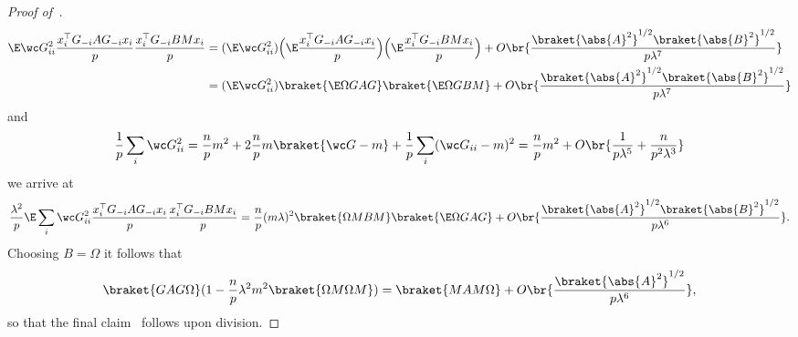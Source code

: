 \begin{proof}[Proof of~]
\begin{equation}
        \begin{split}
            \E\wc G_{ii}^2 \frac{x_i^\top G_{-i} AG_{-i}x_i}{p}\frac{x_i^\top G_{-i} B M x_i}{p} &= (\E \wc G_{ii}^2) \Bigl(\E \frac{x_i^\top G_{-i} A G_{-i}x_i}{p}\Bigr) \Bigl(\E \frac{x_i^\top G_{-i} B M x_i}{p}\Bigr) + O\br{\frac{\braket{\abs{A}^2}^{1/2}\braket{\abs{B}^2}^{1/2}}{p\lambda^7}}\\
            &=(\E \wc G_{ii}^2) \braket{\E \Omega G A G} \braket{ \E \Omega G B M} + O\br{\frac{\braket{\abs{A}^2}^{1/2}\braket{\abs{B}^2}^{1/2}}{p\lambda^7}}
        \end{split}
    \end{equation}
    and
    \begin{equation}
        \frac{1}{p}\sum_i \wc G_{ii}^2 = \frac{n}{p}m^2 +2 \frac{n}{p}m \braket{\wc G-m} + \frac{1}{p}\sum_i (\wc G_{ii}-m)^2= \frac{n}{p}m^2 +O\br{\frac{1}{p\lambda^5} + \frac{n}{p^2\lambda^3}}
    \end{equation}
    we arrive at
    \begin{equation}
        \frac{\lambda^2}{p} \E\sum_i \wc G_{ii}^2 \frac{x_i^\top G_{-i} AG_{-i}x_i}{p}\frac{x_i^\top G_{-i} B M x_i}{p} = \frac{n}{p}(m\lambda)^2 \braket{\Omega M B M} \braket{\E \Omega G A G} + O\br{\frac{\braket{\abs{A}^2}^{1/2}\braket{\abs{B}^2}^{1/2}}{p\lambda^6}}.
    \end{equation}
    Choosing $B=\Omega$ it follows that
    \begin{equation}
        \braket{GA G \Omega}(1 - \frac{n}{p}\lambda^2 m^2 \braket{\Omega M \Omega M}) = \braket{MA M \Omega}   + O\br{\frac{\braket{\abs{A}^2}^{1/2}}{p\lambda^6}},
    \end{equation}
    so that the final claim~ follows upon division.


\end{proof}
